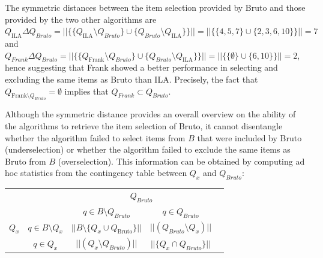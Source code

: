 \documentclass[12pt, a4paper, titilepage]{article}
\begin{document}
The symmetric distances between the item selection provided by Bruto and those provided by the two other algorithms are $Q_{\text{ILA}} \Delta Q_{Bruto} = ||\{ \{Q_{\text{ILA}} \setminus Q_{Bruto}\} \cup \{Q_{Bruto} \setminus Q_{\text{ILA}}\} \}|| = ||\{ \{4,5,7\} \cup \{2,3,6,10\} \}|| = 7$ and $Q_{Frank} \Delta Q_{Bruto} = ||\{ \{Q_{\text{Frank}} \setminus Q_{Bruto}\} \cup \{Q_{Bruto} \setminus Q_{\text{ILA}}\} \}||= ||\{ \{\emptyset\} \cup \{6,10\} \}|| =2$, hence suggesting that Frank showed a better performance in selecting and excluding the same items as Bruto than ILA. Precisely, the fact that $Q_{\text{Frank}\setminus Q_{Bruto}} = \emptyset$ implies that $Q_{Frank} \subset Q_{Bruto}$. %

Although the symmetric distance provides an overall overview on the ability of the algorithms to retrieve the item selection of Bruto, it cannot disentangle whether the algorithm failed to select items from $B$ that were included by Bruto (underselection) or whether the algorithm failed to exclude the same items as Bruto from $B$ (overselection). 
This information can be obtained by computing ad hoc statistics from the contingency table between $Q_x$ and $Q_{Bruto}$:  

\begin{table}[!h]
	\centering
	\begin{tabular}{c |c| c| c | c}
		\multicolumn{2}{c}{}	& \multicolumn{2}{c}{$Q_{Bruto}$} & \\
			\cline{3-4}
		\multicolumn{2}{c}{} & \multicolumn{
			1}{|c}{$q \in B \setminus Q_{Bruto}$} & \multicolumn{
	1}{c|}{$q \in Q_{Bruto}$}& \\	
		\cline{2-4}
		$Q_x$ & $q \in B \setminus Q_{x}$ & $||B \setminus \{Q_x \cup Q_{\text{Bruto}}\}||$ & $||(Q_{Bruto} \setminus Q_x)||$ &  \\
		& $q \in Q_x$ & $||(Q_{x} \setminus Q_{Bruto})||$ & $||\{Q_x \cap Q_{Bruto}\}||$ & \\
		\cline{2-4}
	\end{tabular}
\end{table}
\end{document}
